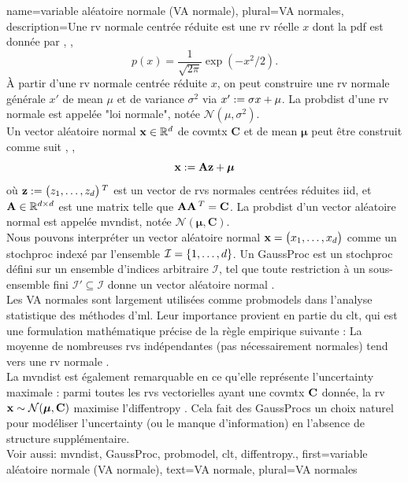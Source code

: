 {name={variable aléatoire normale (VA normale)}, 
	plural={VA normales}, 
	description={Une  \gls{rv} normale centrée réduite est une 
		\gls{rv} réelle $x$ dont la \gls{pdf} est donnée par \cite{BertsekasProb}, \cite{GrayProbBook}, \cite{papoulis}
		\begin{equation}
			\nonumber
			p(x) = \frac{1}{\sqrt{2\pi}} \exp(-x^2/2).
		\end{equation}
		À partir d'une \gls{rv} normale centrée réduite $x$, on peut construire une \gls{rv} normale générale $x'$ 
		de \gls{mean} $\mu$ et de \gls{variance} $\sigma^2$ via $x' := \sigma x + \mu$. 
		La \gls{probdist} d’une \gls{rv} normale est appelée "loi normale", notée $\mathcal{N}(\mu, \sigma^2)$.
		\\
		Un \gls{vector} aléatoire normal ${\bf x} \in \mathbb{R}^{d}$ de \gls{covmtx} $\mathbf{C}$ 
		et de \gls{mean} ${\bm \mu}$ peut être construit comme suit \cite{GrayProbBook}, \cite{papoulis}, \cite{Lapidoth09}
		\[
		{\bf x} := \mathbf{A} {\bf z} + {\bm \mu}
		\]
		où ${\bf z} := \big( z_{1}, \ldots, z_{d} \big)\,^{T}$ est un \gls{vector} de \glspl{rv} 
		normales centrées réduites \gls{iid}, et ${\bf A} \in \mathbb{R}^{d \times d}$ est une \gls{matrix} 
		telle que ${\bf A} {\bf A}\,^{T} = {\bf C}$.
		La \gls{probdist} d’un \gls{vector} aléatoire normal est appelée \gls{mvndist}, notée 
		$\mathcal{N}({\bm \mu}, \mathbf{C})$.
		\\
		Nous pouvons interpréter un \gls{vector} aléatoire normal ${\bf x}=\big(x_{1},\ldots,x_{d}\big)$ 
		comme un \gls{stochproc} indexé par l'ensemble $\mathcal{I} = \{1,\ldots,d\}$.
		Un \gls{GaussProc} est un \gls{stochproc} défini sur un ensemble d'indices arbitraire $\mathcal{I}$, 
		tel que toute restriction à un sous-ensemble fini $\mathcal{I}' \subseteq \mathcal{I}$ donne 
		un \gls{vector} aléatoire normal \cite{Rasmussen2006Gaussian}.
		\\
		Les VA normales sont largement utilisées comme \glspl{probmodel} dans l’analyse statistique 
		des méthodes d’\gls{ml}. Leur importance provient en partie du \gls{clt}, qui est une formulation 
		mathématique précise de la règle empirique suivante : La moyenne de nombreuses \glspl{rv} indépendantes 
		(pas nécessairement normales) tend vers une \gls{rv} normale \cite{ross2013first}.
		\\
		La \gls{mvndist} est également remarquable en ce qu’elle représente l’\gls{uncertainty} maximale : 
		parmi toutes les \glspl{rv} vectorielles ayant une \gls{covmtx} ${\bf C}$ donnée, la \gls{rv} 
		${\bf x} \sim \mathcal{N}({\bm \mu}, \mathbf{C})$ maximise l’\gls{diffentropy} \cite[Th. 8.6.5]{coverthomas}. 
		Cela fait des \glspl{GaussProc} un choix naturel pour modéliser l’\gls{uncertainty} (ou le manque 
		d’information) en l’absence de structure supplémentaire.
		\\
		Voir aussi: \gls{mvndist}, \gls{GaussProc}, \gls{probmodel}, \gls{clt}, \gls{diffentropy}.},
	first={variable aléatoire normale (VA normale)},
	text={VA normale}, plural={VA normales}
}

